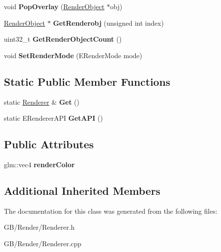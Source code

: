 \begin{DoxyCompactItemize}
void {\bfseries Pop\+Overlay} (\mbox{\hyperlink{class_g_b_1_1_render_object}{Render\+Object}} $\ast$obj)
\item 
\mbox{\label{class_g_b_1_1_renderer_a39ff25b7d91c211001a9a95211ecb0a6}} 
\mbox{\hyperlink{class_g_b_1_1_render_object}{Render\+Object}} $\ast$ {\bfseries Get\+Renderobj} (unsigned int index)
\item 
\mbox{\label{class_g_b_1_1_renderer_adbcbc5b4bc8449561fe94a9331dab5c1}} 
uint32\+\_\+t {\bfseries Get\+Render\+Object\+Count} ()
\item 
\mbox{\label{class_g_b_1_1_renderer_a380161499512eeb545fa1a1aa5fcb528}} 
void {\bfseries Set\+Render\+Mode} (E\+Render\+Mode mode)
\end{DoxyCompactItemize}
\subsection*{Static Public Member Functions}
\begin{DoxyCompactItemize}
\item 
\mbox{\label{class_g_b_1_1_renderer_aa74a30c5a7d1c12ddaf1743e284b6582}} 
static \mbox{\hyperlink{class_g_b_1_1_renderer}{Renderer}} \& {\bfseries Get} ()
\item 
\mbox{\label{class_g_b_1_1_renderer_aa08c915acec52745842c54a2911f825e}} 
static E\+Renderer\+A\+PI {\bfseries Get\+A\+PI} ()
\end{DoxyCompactItemize}
\subsection*{Public Attributes}
\begin{DoxyCompactItemize}
\item 
\mbox{\label{class_g_b_1_1_renderer_ad4004b919cc6af5f5f0d992ab7a391f1}} 
glm\+::vec4 {\bfseries render\+Color}
\end{DoxyCompactItemize}
\subsection*{Additional Inherited Members}


The documentation for this class was generated from the following files\+:\begin{DoxyCompactItemize}
\item 
G\+B/\+Render/Renderer.\+h\item 
G\+B/\+Render/Renderer.\+cpp\end{DoxyCompactItemize}
